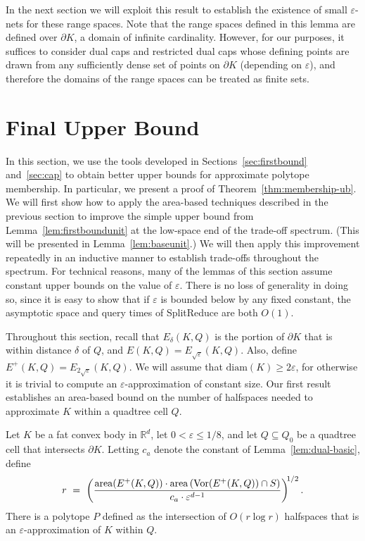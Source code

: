\documentclass[11pt]{article}   \usepackage[letterpaper,hmargin=2.1cm,vmargin=3cm]{geometry}
\newcommand{\RE}{\mathbb{R}}    \newcommand{\ZZ}{\mathbb{Z}}    \newcommand{\eps}{\varepsilon}  \newcommand{\ST}{\,:\,}         \newcommand{\sq}{\square}
\newcommand{\alg}{\textrm{SplitReduce}}
\newcommand{\diam}{\mathrm{diam}}
\newcommand{\area}{\mathrm{area}}
\newcommand{\Vor}{\mathrm{Vor}}
\begin{document}
In the next section we will exploit this result to establish the existence of small $\eps$-nets for these range spaces. Note that the range spaces defined in this lemma are defined over $\partial K$, a domain of infinite cardinality. However, for our purposes, it suffices to consider dual caps and restricted dual caps whose defining points are drawn from any sufficiently dense set of points on $\partial K$ (depending on $\eps$), and therefore the domains of the range spaces can be treated as finite sets.

\section{Final Upper Bound} \label{sec:membership}


In this section, we use the tools developed in Sections~\ref{sec:firstbound} and~\ref{sec:cap} to obtain better upper bounds for approximate polytope membership. In particular, we present a proof of Theorem~\ref{thm:membership-ub}. We will first show how to apply the area-based techniques described in the previous section to improve the simple upper bound from Lemma~\ref{lem:firstboundunit} at the low-space end of the trade-off spectrum. (This will be presented in Lemma~\ref{lem:baseunit}.) We will then apply this improvement repeatedly in an inductive manner to establish trade-offs throughout the spectrum. For technical reasons, many of the lemmas of this section assume constant upper bounds on the value of $\eps$. There is no loss of generality in doing so, since it is easy to show that if $\eps$ is bounded below by any fixed constant, the asymptotic space and query times of {\alg} are both $O(1)$.

Throughout this section, recall that $E_{\delta}(K,Q)$ is the portion of $\partial K$ that is within distance $\delta$ of $Q$, and $E(K,Q) = E_{\sqrt{\eps}}(K,Q)$. Also, define $E^+(K,Q) = E_{2\sqrt{\eps}}(K,Q)$. We will assume that $\diam(K) \ge 2 \eps$, for otherwise it is trivial to compute an $\eps$-approximation of constant size. Our first result establishes an area-based bound on the number of halfspaces needed to approximate $K$ within a quadtree cell $Q$.

\begin{lemma} \label{lem:Guilherme}
Let $K$ be a fat convex body in $\RE^d$, let $0 < \eps \le 1/8$, and let $Q \subseteq Q_0$ be a quadtree cell that intersects $\partial K$. Letting $c_a$ denote the constant of Lemma~\ref{lem:dual-basic}, define
\[
	r 
		~ = ~ \left(\frac{\area(E^+(K,Q)) \cdot \area\left(\Vor(E^+(K,Q)) \cap S\right)}{c_a \cdot \eps^{d-1}} \right)^{\N 1/2}.
\]
There is a polytope $P$ defined as the intersection of $O(r \log r)$ halfspaces that is an $\eps$-approximation of $K$ within $Q$.
\end{lemma}
\end{document}
